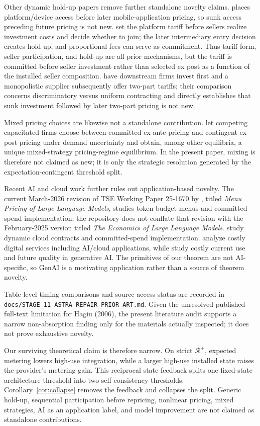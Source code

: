 Other dynamic hold-up papers remove further standalone novelty claims. \citet{gans2012} places platform/device access before later mobile-application pricing, so sunk access preceding future pricing is not new. \citet{mutherswismer2022} set the platform tariff before sellers realize investment costs and decide whether to join; the later intermediary entry decision creates hold-up, and proportional fees can serve as commitment. Thus tariff form, seller participation, and hold-up are all prior mechanisms, but the tariff is committed before seller investment rather than selected ex post as a function of the installed seller composition. \citet{minryu2025} have downstream firms invest first and a monopolistic supplier subsequently offer two-part tariffs; their comparison concerns discriminatory versus uniform contracting and directly establishes that sunk investment followed by later two-part pricing is not new.

Mixed pricing choices are likewise not a standalone contribution. \citet{wanghu2014} let competing capacitated firms choose between committed ex-ante pricing and contingent ex-post pricing under demand uncertainty and obtain, among other equilibria, a unique mixed-strategy pricing-regime equilibrium. In the present paper, mixing is therefore not claimed as new; it is only the strategic resolution generated by the expectation-contingent threshold split.

Recent AI and cloud work further rules out application-based novelty. The current March-2026 revision of TSE Working Paper 25-1670 by \citet{bergemannbonattismolin2025}, titled \emph{Menu Pricing of Large Language Models}, studies token-budget menus and committed-spend implementation; the repository does not conflate that revision with the February-2025 version titled \emph{The Economics of Large Language Models}. \citet{bergemannwang2025} study dynamic cloud contracts and committed-spend implementation. \citet{bhaskaran2026} analyze costly digital services including AI/cloud applications, while \citet{bichuchyaish2026} study costly current use and future quality in generative AI. The primitives of our theorem are not AI-specific, so GenAI is a motivating application rather than a source of theorem novelty.

Table-level timing comparisons and source-access status are recorded in \texttt{docs/STAGE\_11\_ASTRA\_REPAIR\_PRIOR\_ART.md}. Given the unresolved published-full-text limitation for Hagiu (2006), the present literature audit supports a narrow non-absorption finding only for the materials actually inspected; it does not prove exhaustive novelty.

Our surviving theoretical claim is therefore narrow. On strict $\mathcal R^+$, expected metering lowers high-use integration, while a larger high-use installed state raises the provider's metering gain. This reciprocal state feedback splits one fixed-state architecture threshold into two self-consistency thresholds. Corollary~\ref{cor:collapse} removes the feedback and collapses the split. Generic hold-up, sequential participation before repricing, nonlinear pricing, mixed strategies, AI as an application label, and model improvement are not claimed as standalone contributions.
